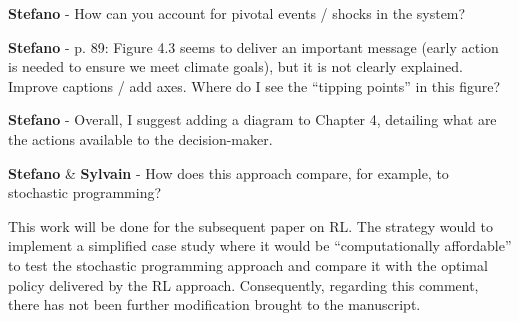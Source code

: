 \documentclass[12pt,a4paper]{article}
\begin{document}
\begin{mdframed}[style=comment] %
{\color{orange} \textbf{Stefano}} - How can you account for pivotal events / shocks in the system?
\end{mdframed}

\noindent 

\begin{mdframed}[style=manuscript] %

\end{mdframed}

\begin{mdframed}[style=comment] %
{\color{orange} \textbf{Stefano}} - p. 89: Figure 4.3 seems to deliver an important message (early action is needed to ensure we meet climate goals), but it is not clearly explained. Improve captions / add axes. 	Where do I see the ``tipping points'' in this figure?
\end{mdframed}

\noindent 

\begin{mdframed}[style=manuscript] %

\end{mdframed}

\begin{mdframed}[style=comment] %
{\color{orange} \textbf{Stefano}} - Overall, I suggest adding a diagram to Chapter 4, detailing what are the actions available to the decision-maker.
\end{mdframed}

\noindent 

\begin{mdframed}[style=manuscript] %

\end{mdframed}

\begin{mdframed}[style=comment] %
{\color{orange} \textbf{Stefano}} \& {\color{purple} \textbf{Sylvain}} - How does this approach compare, for example, to stochastic programming?
\end{mdframed}

\noindent This work will be done for the subsequent paper on RL. The strategy would to implement a simplified case study where it would be ``computationally affordable'' to test the stochastic programming approach and compare it with the optimal policy delivered by the RL approach. Consequently, regarding this comment, there has not been further modification brought to the manuscript.
\end{document}
